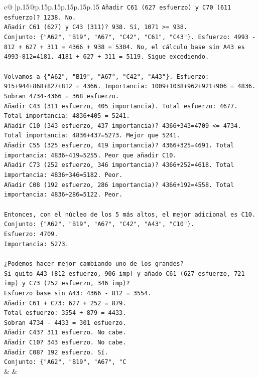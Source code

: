\documentclass{article}
\begin{document}
{\begin{supertabular}{c@{$\;$}|p{.15\linewidth}@{}p{.15\linewidth}p{.15\linewidth}p{.15\linewidth}p{.15\linewidth}p{.15\linewidth}}
{{{\texttt{Añadir C61 (627 esfuerzo) y C70 (611 esfuerzo)? 1238. No.} \\
\texttt{Añadir C61 (627) y C43 (311)? 938. Sí, 1071 >= 938.} \\
\texttt{Conjunto: \{"A62", "B19", "A67", "C42", "C61", "C43"\}. Esfuerzo: 4993 {-} 812 + 627 + 311 = 4366 + 938 = 5304. No, el cálculo base sin A43 es 4993{-}812=4181. 4181 + 627 + 311 = 5119. Sigue excediendo.} \\
\\ 
\texttt{Volvamos a \{"A62", "B19", "A67", "C42", "A43"\}. Esfuerzo: 915+944+868+827+812 = 4366. Importancia: 1009+1038+962+921+906 = 4836. Sobran 4734{-}4366 = 368 esfuerzo.} \\
\texttt{Añadir C43 (311 esfuerzo, 405 importancia). Total esfuerzo: 4677. Total importancia: 4836+405 = 5241.} \\
\texttt{Añadir C10 (343 esfuerzo, 437 importancia)? 4366+343=4709 <= 4734. Total importancia: 4836+437=5273. Mejor que 5241.} \\
\texttt{Añadir C55 (325 esfuerzo, 419 importancia)? 4366+325=4691. Total importancia: 4836+419=5255. Peor que añadir C10.} \\
\texttt{Añadir C73 (252 esfuerzo, 346 importancia)? 4366+252=4618. Total importancia: 4836+346=5182. Peor.} \\
\texttt{Añadir C08 (192 esfuerzo, 286 importancia)? 4366+192=4558. Total importancia: 4836+286=5122. Peor.} \\
\\ 
\texttt{Entonces, con el núcleo de los 5 más altos, el mejor adicional es C10.} \\
\texttt{Conjunto: \{"A62", "B19", "A67", "C42", "A43", "C10"\}.} \\
\texttt{Esfuerzo: 4709.} \\
\texttt{Importancia: 5273.} \\
\\ 
\texttt{¿Podemos hacer mejor cambiando uno de los grandes?} \\
\texttt{Si quito A43 (812 esfuerzo, 906 imp) y añado C61 (627 esfuerzo, 721 imp) y C73 (252 esfuerzo, 346 imp)?} \\
\texttt{Esfuerzo base sin A43: 4366 {-} 812 = 3554.} \\
\texttt{Añadir C61 + C73: 627 + 252 = 879.} \\
\texttt{Total esfuerzo: 3554 + 879 = 4433.} \\
\texttt{Sobran 4734 {-} 4433 = 301 esfuerzo.} \\
\texttt{Añadir C43? 311 esfuerzo. No cabe.} \\
\texttt{Añadir C10? 343 esfuerzo. No cabe.} \\
\texttt{Añadir C08? 192 esfuerzo. Sí.} \\
\texttt{Conjunto: \{"A62", "B19", "A67", "C} \\
            }
        }
    }
    & & \\ \\


\end{supertabular}}
\end{document}
